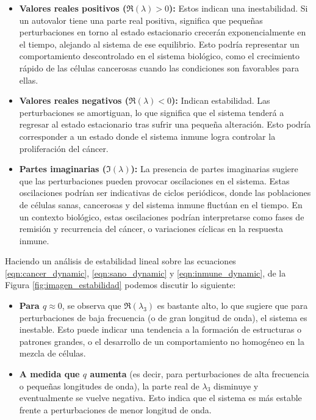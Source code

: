 \documentclass{article}
\begin{document}
\begin{itemize}
    \item \textbf{Valores reales positivos ($\Re(\lambda) > 0$):} Estos indican una inestabilidad. Si un autovalor tiene una parte real positiva, significa que pequeñas perturbaciones en torno al estado estacionario crecerán exponencialmente en el tiempo, alejando al sistema de ese equilibrio. Esto podría representar un comportamiento descontrolado en el sistema biológico, como el crecimiento rápido de las células cancerosas cuando las condiciones son favorables para ellas.
    
    \item \textbf{Valores reales negativos ($\Re(\lambda) < 0$):} Indican estabilidad. Las perturbaciones se amortiguan, lo que significa que el sistema tenderá a regresar al estado estacionario tras sufrir una pequeña alteración. Esto podría corresponder a un estado donde el sistema inmune logra controlar la proliferación del cáncer.
    
    \item \textbf{Partes imaginarias ($\Im(\lambda)$):} La presencia de partes imaginarias sugiere que las perturbaciones pueden provocar oscilaciones en el sistema. Estas oscilaciones podrían ser indicativas de ciclos periódicos, donde las poblaciones de células sanas, cancerosas y del sistema inmune fluctúan en el tiempo. En un contexto biológico, estas oscilaciones podrían interpretarse como fases de remisión y recurrencia del cáncer, o variaciones cíclicas en la respuesta inmune.
\end{itemize}

Haciendo  un análisis de estabilidad lineal sobre las ecuaciones \ref{eqn:cancer_dynamic}, \ref{eqn:sano_dynamic} y  \ref{eqn:inmune_dynamic}, de la Figura \ref{fig:imagen_estabilidad} podemos discutir lo siguiente:


\begin{itemize}
    \item \textbf{Para $q \approx 0$}, se observa que $\Re(\lambda_3)$ es bastante alto, lo que sugiere que para perturbaciones de baja frecuencia (o de gran longitud de onda), el sistema es inestable. Esto puede indicar una tendencia a la formación de estructuras o patrones grandes, o el desarrollo de un comportamiento no homogéneo en la mezcla de células.
    
    \item \textbf{A medida que \(q\) aumenta} (es decir, para perturbaciones de alta frecuencia o pequeñas longitudes de onda), la parte real de \(\lambda_3\) disminuye y eventualmente se vuelve negativa. Esto indica que el sistema es más estable frente a perturbaciones de menor longitud de onda.
    
\end{itemize}
\end{document}
